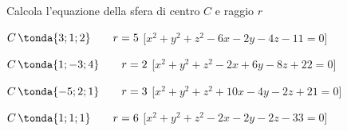 \begin{esercizio}
Calcola l'equazione della sfera di centro \(C\) e raggio \(r\)
 \begin{enumeratea}
  \item  \(C\,\tonda{3;1;2} \qquad r = 5\)    \hfill [\(x^2+y^2+z^2-6x-2y-4z-11=0\)]
  \item  \(C\,\tonda{1;-3;4} \qquad r = 2\)    \hfill [\(x^2+y^2+z^2-2x+6y-8z+22=0\)]
  \item  \(C\,\tonda{-5;2;1} \qquad r = 3\)    \hfill [\(x^2+y^2+z^2+10x-4y-2z+21=0\)]
  \item  \(C\,\tonda{1;1;1} \qquad r = 6\)    \hfill [\(x^2+y^2+z^2-2x-2y-2z-33=0\)]
 \end{enumeratea}
\end{esercizio}

% 
% 

